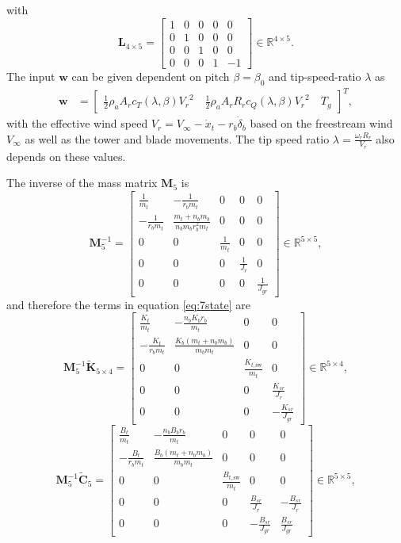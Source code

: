 with 
\[
\mathbf{L}_{4 \times5} = \begin{bmatrix}
    1 & 0 & 0 & 0 & 0 \\
    0 & 1 & 0 & 0 & 0 \\
    0 & 0 & 1 & 0 & 0 \\
    0 & 0 & 0 & 1 & -1
\end{bmatrix} \in \mathbb{R}^{4 \times 5}.
\]
%
The input $\bm{w}$ can be given dependent on pitch $\beta = \beta_0$ and tip-speed-ratio $\lambda$ as
\begin{align*}
    \bm{w} & =\begin{bmatrix}
        \frac{1}{2}\rho_a A_rc_{T}(\lambda
        ,\beta){V_r}^{2} \quad
        \frac{1}{2}\rho_a A_rR_rc_Q(\lambda,\beta){V_r}^{2} 
        \quad T_g
    \end{bmatrix}^T,  
\end{align*}
with the effective wind speed $V_r = V_{\infty} -\dot{x}_t- r_b\dot{\delta}_b$ based on the freestream wind $V_{\infty}$ as well as the tower and blade movements. The tip speed ratio $\lambda= \frac {\omega_{r}R_r}{V_r}$ also depends on these values.

The inverse of the mass matrix $\mathbf{M}_5$ is
\[
\mathbf{M}_5^{-1} = \begin{bmatrix}
    \frac{1}{m_t} & -\frac{1} {r_b m_t} & 0 & 0 & 0\\
    -\frac{1}{r_b m_t} & \frac{m_t +n_b m_b}{n_b m_b r^2_b m_t} & 0 & 0 & 0\\
    0 & 0 & \frac{1}{m_t} & 0 &0\\
    0 & 0 & 0 & \frac{1}{J_r} & 0\\
    0 & 0 & 0 & 0 & \frac{1}{J_{gr}}
\end{bmatrix} \in \mathbb{R}^{5 \times 5},
\]
and therefore the terms in equation \eqref{eq:7state} are 
\[
\mathbf{M}_5^{-1}\tilde{\mathbf{K}}_{5 \times 4} =
 \begin{bmatrix}
    \frac{K_t}{m_t} &- \frac{n_b K_b r_b} {m_t} & 0 & 0 \\
    -\frac{K_t}{r_b m_t} & \frac{K_b(m_t + n_b m_b)}{m_b m_t} & 0 & 0 \\
    0 & 0 & \frac{K_{t,\text{sw}}}{m_t} & 0 \\
    0 & 0 & 0 & \frac{K_{sr}}{J_r} \\
    0 & 0 & 0 & -\frac{K_{sr}}{J_{gr}}
\end{bmatrix} \in \mathbb{R}^{5 \times 4},
\]
\[
\mathbf{M}_5^{-1}\tilde{\mathbf{C}}_{5} = \begin{bmatrix}
    \frac{B_t}{m_t} & - \frac{n_b B_b r_b} {m_t} & 0 & 0 & 0\\
    -\frac{B_t}{r_b m_t} & \frac{B_b(m_t + n_b m_b)}{m_b m_t} & 0 & 0 & 0\\
    0 & 0 & \frac{B_{t,\text{sw}}}{m_t} & 0 &0\\
    0 & 0 & 0 & \frac{B_{sr}}{J_r} & -\frac{B_{sr}}{J_r}\\
    0 & 0 & 0 & -\frac{B_{sr}}{J_{gr}} & \frac{B_{sr}}{J_{gr}}
\end{bmatrix} \in \mathbb{R}^{5 \times 5},
\]


